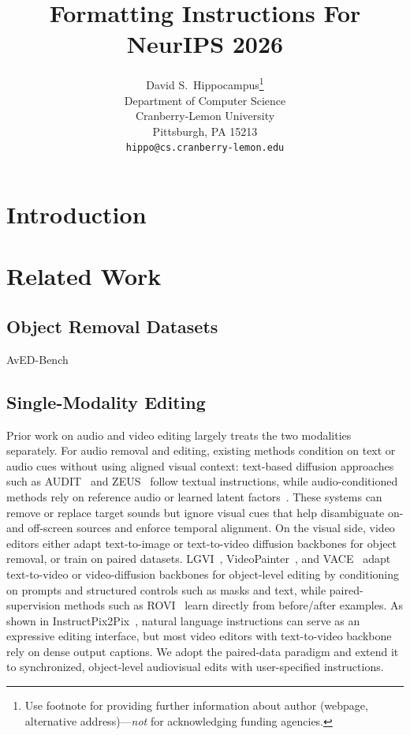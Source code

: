 \documentclass{article}
\title{Formatting Instructions For NeurIPS 2026}
\author{%
  David S.~Hippocampus\thanks{Use footnote for providing further information
    about author (webpage, alternative address)---\emph{not} for acknowledging
    funding agencies.} \\
  Department of Computer Science\\
  Cranberry-Lemon University\\
  Pittsburgh, PA 15213 \\
  \texttt{hippo@cs.cranberry-lemon.edu} \\
}
\begin{document}
\maketitle


\begin{abstract}

\end{abstract}



\section{Introduction}


\section{Related Work}
\subsection{Object Removal Datasets}
AvED-Bench
\subsection{Single-Modality Editing}
Prior work on audio and video editing largely treats the two modalities separately. For audio removal and editing, existing methods condition on text or audio cues without using aligned visual context: text-based diffusion approaches such as AUDIT~\cite{wang2023auditaudioeditingfollowing} and ZEUS~\cite{manor2024zeroshotunsupervisedtextbasedaudio} follow textual instructions, while audio-conditioned methods rely on reference audio or learned latent factors~\cite{cheng2025audio,liang2025audiomorphix}. These systems can remove or replace target sounds but ignore visual cues that help disambiguate on- and off-screen sources and enforce temporal alignment. On the visual side, video editors either adapt text-to-image or text-to-video diffusion backbones for object removal, or train on paired datasets. LGVI~\cite{wu2024languagedrivenvideoinpaintingmultimodal}, VideoPainter~\cite{bian2025videopainteranylengthvideoinpainting}, and VACE~\cite{jiang2025vaceallinonevideocreation} adapt text-to-video or video-diffusion backbones for object-level editing by conditioning on prompts and structured controls such as masks and text, while paired-supervision methods such as ROVI~\cite{wu2024languagedrivenvideoinpaintingmultimodal} learn directly from before/after examples. As shown in InstructPix2Pix~\cite{brooks2023instructpix2pixlearningfollowimage}, natural language instructions can serve as an expressive editing interface, but most video editors with text-to-video backbone rely on dense output captions. We adopt the paired-data paradigm and extend it to synchronized, object-level audiovisual edits with user-specified instructions.
\end{document}
